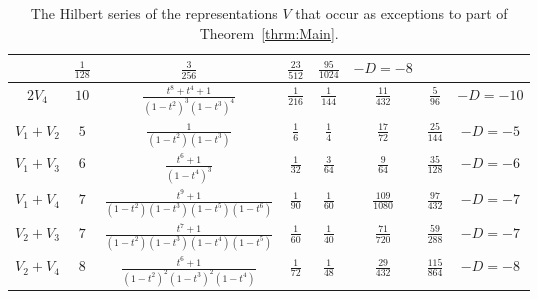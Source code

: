\documentclass{amsart}
\theoremstyle{definition}
\theoremstyle{remark}
\begin{document}
\begin{table}[h]
\begin{tabular}{|c|c|c|c|c|c|c|c|}
    &   $\frac{1}{128}$     &   $\frac{3}{256}$     &   $\frac{23}{512}$    &   $\frac{95}{1024}$
    &   $-D = -8$
\\ \hline
    $2V_4$      &   $10$    &   $\frac{t^8 + t^4 + 1}{(1 - t^2)^3 (1 - t^3)^4}$
    &   $\frac{1}{216}$     &   $\frac{1}{144}$     &   $\frac{11}{432}$    &   $\frac{5}{96}$
    &   $-D = -10$
\\ \hline
    $V_1 + V_2$ &   $5$     &   $\frac{1}{(1 - t^2)(1 - t^3)}$
    &   $\frac{1}{6}$       &   $\frac{1}{4}$       &   $\frac{17}{72}$     &   $\frac{25}{144}$
    &   $-D = -5$
\\ \hline
    $V_1 + V_3$ &   $6$     &   $\frac{t^6 + 1}{(1 - t^4)^3}$
    &   $\frac{1}{32}$      &   $\frac{3}{64}$      &   $\frac{9}{64}$      &   $\frac{35}{128}$
    &   $-D = -6$
\\ \hline
    $V_1+V_4$   &   $7$     &   $\frac{t^9 + 1}{(1 - t^2) (1 - t^3) (1 - t^5) (1 - t^6)}$
    &   $\frac{1}{90}$      &   $\frac{1}{60}$      &   $\frac{109}{1080}$  &   $\frac{97}{432}$
    &   $-D = -7$
\\ \hline
    $V_2+V_3$   &   $7$     &   $\frac{t^7 + 1}{(1 - t^2) (1 - t^3) (1 - t^4) (1 - t^5)}$
    &   $\frac{1}{60}$      &   $\frac{1}{40}$      &   $\frac{71}{720}$    &   $\frac{59}{288}$
    &   $-D = -7$
\\ \hline
    $V_2+V_4$   &   $8$     &   $\frac{t^6 + 1}{(1 - t^2)^2 (1 - t^3)^2 (1 - t^4)}$
    &   $\frac{1}{72}$      &   $\frac{1}{48}$      &   $\frac{29}{432}$    &   $\frac{115}{864}$
    &   $-D = -8$
\\ \hline
\end{tabular} \vspace{.3cm}
\caption{The Hilbert series of the representations $V$ that occur as exceptions to part of
Theorem~\ref{thrm:Main}.}
\end{table}







\end{document}
